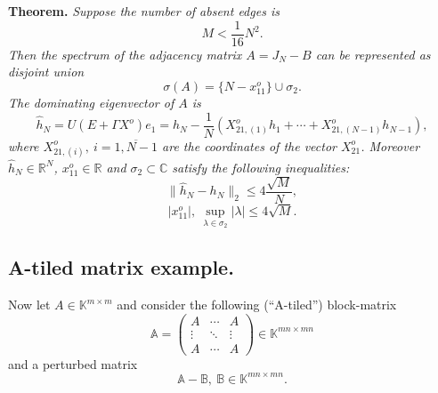 \documentclass[a4paper]{jpconf}
\begin{document}
\textbf{Theorem.}
{\it
    Suppose the number of absent edges is
    \[ M < \frac{1}{16} N^2. \]
    Then the spectrum of the adjacency matrix \( A = J_N - B \)
        can be represented as disjoint union
    \[
        \sigma(A) = \{ N - x_{11}^o \} \cup \sigma_2.
    \]
    The dominating eigenvector of \( A \) is
    \[
        \hat{h}_N = U(E+\Gamma X^o) e_1 =
            h_N - \frac1N (X_{21,(1)}^o h_1 + \cdots + X_{21, (N{-}1)}^o h_{N{-}1}),
    \]
    where \( X_{21,(i)}^o,\ i=\overline{1,N{-}1} \) are the coordinates
    of the vector \( X_{21}^o \).
    Moreover \( \hat{h}_N\in\mathbb{R}^{N} \),
    \( x_{11}^o\in\mathbb{R} \) and \( \sigma_2\subset\mathbb{C} \)
    satisfy the following inequalities:
    \[
        \|\hat{h}_N - h_N\|_2 \leq 4\frac{\sqrt{M}}{N},
    \]
    \[
        \lvert x_{11}^o \rvert,
        \ \sup_{\lambda\in\sigma_2} \lvert\lambda\rvert \leq 4\sqrt{M}.
    \]
}

\subsection*{A-tiled matrix example.}

Now let \( A\in\mathbb{K}^{m{\times}m} \)
    and consider the following (``A-tiled'') block-matrix
    \[
        \mathbb{A} =
        \begin{pmatrix}
            A & \cdots & A \\
            \vdots & \ddots & \vdots \\
            A & \cdots & A
        \end{pmatrix}
        \in\mathbb{K}^{{mn}{\times}{mn}}
    \]
    and a perturbed matrix
    \[
        \mathbb{A} - \mathbb{B},\ \mathbb{B}\in\mathbb{K}^{{mn}{\times}{mn}}.
    \]
\end{document}
